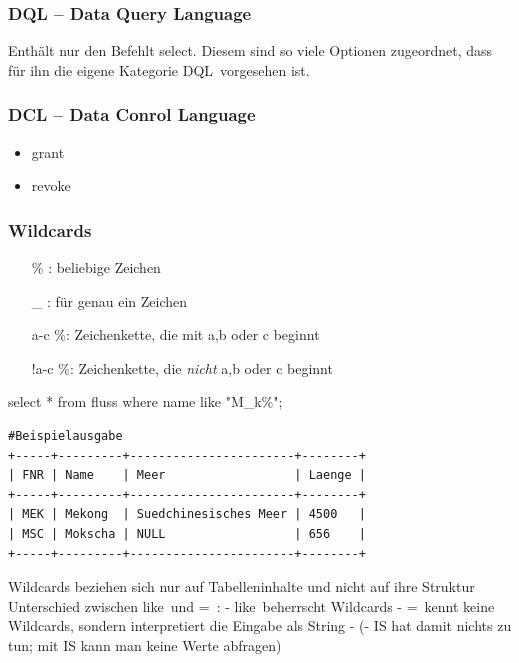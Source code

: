 \subsubsection{DQL -- Data Query Language}
Enthält nur den Befehlt \ql select\qr. Diesem sind so viele Optionen zugeordnet, dass für ihn die eigene Kategorie \ql DQL\qr\ vorgesehen ist.

\subsubsection{DCL -- Data Conrol Language}
	
	\begin{itemize}
		\item grant
		\item revoke
	\end{itemize}
	
\subsubsection{Wildcards}

\begin{itemize}
	\item [\%]: beliebige Zeichen
	\item [\_]: für genau ein Zeichen
	\item [a-c]\%: Zeichenkette, die mit a,b oder c beginnt  
	\item [!a-c]\%: Zeichenkette, die \emph{nicht} a,b oder c beginnt
\end{itemize}

select * from fluss where name like "M\_k\%";
\begin{lstlisting}
#Beispielausgabe
+-----+---------+-----------------------+--------+
| FNR | Name    | Meer                  | Laenge |
+-----+---------+-----------------------+--------+
| MEK | Mekong  | Suedchinesisches Meer | 4500   |
| MSC | Mokscha | NULL                  | 656    |
+-----+---------+-----------------------+--------+
\end{lstlisting}

Wildcards beziehen sich nur auf Tabelleninhalte und nicht auf ihre Struktur
Unterschied zwischen \ql like\qr\ und \ql =\qr\ :
- \ql like\qr\ beherrscht Wildcards
- \ql =\qr\ kennt keine Wildcards, sondern interpretiert die Eingabe als String
- (- IS hat damit nichts zu tun; mit IS kann man keine Werte abfragen)

